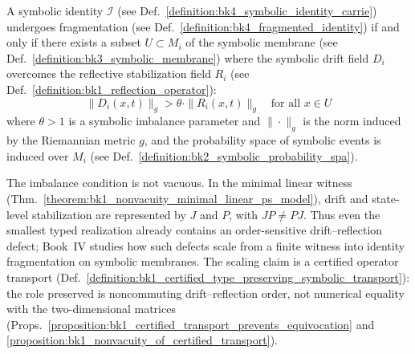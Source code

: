 \begin{theorem} \label{theorem:bk4_drift_reflection_imbalance}
A symbolic identity $\mathcal{I}$ (see Def.~\ref{definition:bk4_symbolic_identity_carrie}) undergoes fragmentation (see Def.~\ref{definition:bk4_fragmented_identity}) if and only if there exists a subset $U \subset M_i$ of the symbolic membrane (see Def.~\ref{definition:bk3_symbolic_membrane}) where the symbolic drift field $D_i$ overcomes the reflective stabilization field $R_i$ (see Def.~\ref{definition:bk1_reflection_operator}):
\begin{equation}
    \|D_i(x,t)\|_g > \theta \cdot \|R_i(x,t)\|_g \quad \text{for all } x \in U
\end{equation}
where $\theta > 1$ is a symbolic imbalance parameter and $\|\cdot\|_g$ is the norm induced by the Riemannian metric $g$, and the probability space of symbolic events is induced over $M_i$ (see Def.~\ref{definition:bk2_symbolic_probability_spa}).
\end{theorem}
\begin{remark}
\label{remark:bk4_finite_witness_for_drift_reflection_imbalance}
The imbalance condition is not vacuous.  In the minimal linear witness
(Thm.~\ref{theorem:bk1_nonvacuity_minimal_linear_ps_model}), drift and
state-level stabilization are represented by \(J\) and \(P\), with
\(JP\ne PJ\).  Thus even the smallest typed realization already contains an
order-sensitive drift--reflection defect; Book~IV studies how such defects
scale from a finite witness into identity fragmentation on symbolic membranes.
The scaling claim is a certified operator transport
(Def.~\ref{definition:bk1_certified_type_preserving_symbolic_transport}): the
role preserved is noncommuting drift--reflection order, not numerical equality
with the two-dimensional matrices (Props.~\ref{proposition:bk1_certified_transport_prevents_equivocation} and \ref{proposition:bk1_nonvacuity_of_certified_transport}).
\end{remark}
